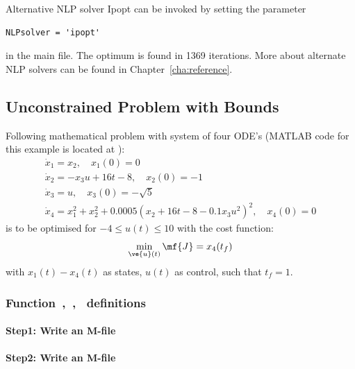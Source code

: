 Alternative NLP solver Ipopt can be invoked by setting the parameter
\begin{verbatim}
NLPsolver = 'ipopt'
\end{verbatim}
in the main file. The optimum is found in 1369 iterations. More about alternate
NLP solvers can be found in Chapter~\ref{cha:reference}.

\subsection{Unconstrained Problem with Bounds}
\label{sec:unconprobgradbound}

Following mathematical problem \citep{raj01,luu90_51} with system of
four ODE's (MATLAB code for this example is located at
):
\begin{gather}
\dot{x}_1 = x_{2}, \quad x_{1}(0) = 0\\
\dot{x}_2 = -x_{3}u + 16t - 8, \quad x_{2}(0) = -1\\
\dot{x}_3 = u, \quad x_{3}(0) = -\sqrt{5}\\
\dot{x}_4 = x_{1}^{2} + x_{2}^{2} + 0.0005(x_{2} + 16t - 8 -
0.1x_{3}u^{2})^{2}, \quad x_{4}(0) = 0
\end{gather} is to be optimised for $-4 \leq u(t) \leq 10$ with the
cost function:  
\begin{equation}
\min_{\ve{u}(t)} \mf{J} = x_{4}(t_{f}) \label{eq:ucpgb}
\end{equation} with $x_1(t) - x_4(t)$ as states, $u(t)$ as control,
such that $t_{f}=1$. 

\subsubsection{Function~,~,~  definitions}
\label{sec:unconprbgradbound-fundef}

\paragraph{Step1: Write an M-file~}

{\small }

\paragraph{Step2: Write an M-file~}

{\small }

